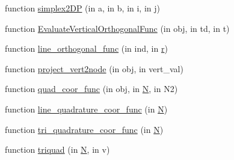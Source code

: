 \begin{DoxyCompactItemize}
\item 
function \hyperlink{class_std_prism_tri_a40a7e2ceeb9306b1916ba59fb857b14a}{simplex2\+DP} (in a, in b, in i, in j)
\item 
function \hyperlink{class_std_prism_tri_ac6980309a531948268b05082a922c305}{Evaluate\+Vertical\+Orthogonal\+Func} (in obj, in td, in t)
\item 
function \hyperlink{class_std_prism_tri_a95c573c90aec2945b9c1c3362c405f6d}{line\+\_\+orthogonal\+\_\+func} (in ind, in \hyperlink{class_std_prism_tri_aad8e1b11ac7552139fe6aacc8728b249}{r})
\item 
function \hyperlink{class_std_prism_tri_a47f65016f3ccc4ece839fb1f29706886}{project\+\_\+vert2node} (in obj, in vert\+\_\+val)
\item 
function \hyperlink{class_std_prism_tri_a43661fbac19c1f477268314516b76daa}{quad\+\_\+coor\+\_\+func} (in obj, in \hyperlink{class_std_prism_tri_ae66dea60d79b3eea15b9be2c1892d784}{N}, in N2)
\item 
function \hyperlink{class_std_prism_tri_ac1e62bffad83080c8c4bec7b37d69c5e}{line\+\_\+quadrature\+\_\+coor\+\_\+func} (in \hyperlink{class_std_prism_tri_ae66dea60d79b3eea15b9be2c1892d784}{N})
\item 
function \hyperlink{class_std_prism_tri_a4ae21011fdd7ecd3f6e70e54676f7187}{tri\+\_\+quadrature\+\_\+coor\+\_\+func} (in \hyperlink{class_std_prism_tri_ae66dea60d79b3eea15b9be2c1892d784}{N})
\item 
function \hyperlink{class_std_prism_tri_a2275ada5f9cc8a150063d38ce5666c7f}{triquad} (in \hyperlink{class_std_prism_tri_ae66dea60d79b3eea15b9be2c1892d784}{N}, in v)
\end{DoxyCompactItemize}
